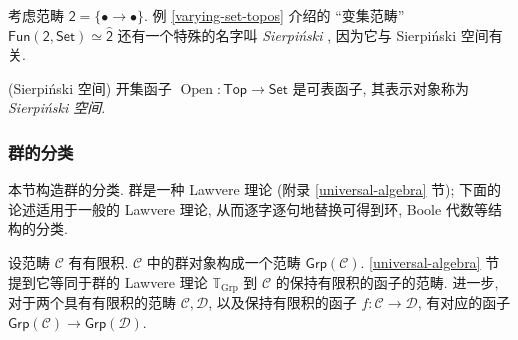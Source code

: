 考虑范畴 $\mathsf 2 = \{\bullet\longrightarrow\bullet\}$. 例 \ref{varying-set-topos} 介绍的 ``变集范畴'' $\mathsf {Fun}(\mathsf {2},\mathsf {Set})\simeq\widehat {\mathsf {2}}$ 还有一个特殊的名字叫 \emph{Sierpi\'nski \topos{}}, 因为它与 Sierpi\'nski 空间有关.

\begin{propdef}
	[label={Sierpinski-space}]
	{(Sierpi\'nski 空间)}
	开集函子 $\operatorname{Open}\colon \mathsf {Top}\to \mathsf {Set}$ 是可表函子, 其表示对象称为 \emph{Sierpi\'nski 空间}.
\end{propdef}

\todo{}

\subsubsection{群的分类\topos{}}

本节构造群的分类\topos{}. 群是一种 Lawvere 理论 (附录 \ref{universal-algebra} 节); 下面的论述适用于一般的 Lawvere 理论, 从而逐字逐句地替换可得到环, Boole 代数等结构的分类\topos{}.
%


设范畴 $\mathcal C$ 有有限积. $\mathcal C$ 中的群对象构成一个范畴 $\mathsf {Grp}(\mathcal C)$.
\ref{universal-algebra} 节提到它等同于群的 Lawvere 理论 $\mathbb T_{\text{Grp}}$ 到 $\mathcal C$ 的保持有限积的函子的范畴.
进一步, 对于两个具有有限积的范畴 $\mathcal C,\mathcal D$, 以及保持有限积的函子 $f \colon \mathcal C \to \mathcal D$, 有对应的函子
$\mathsf {Grp}(\mathcal C) \to \mathsf {Grp}(\mathcal D)$.%

